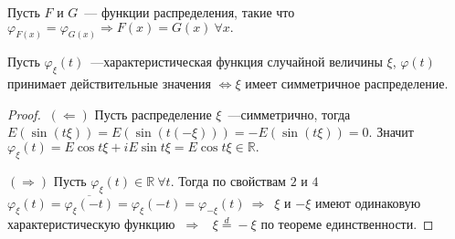 		\begin{theorem}
		Пусть $F$ и $G$~--- функции распределения, такие что $\varphi_{F(x)} = \varphi_{G(x)} \Rightarrow F(x) = G(x)~\forall x.$
	\end{theorem}
	\begin{property}
		Пусть $\varphi_\xi(t)$~---характеристическая функция случайной величины $\xi$, $\varphi(t)$ принимает действительные значения $\Leftrightarrow \xi$ имеет симметричное распределение.
		\begin{proof}
			$~(\Leftarrow)$ Пусть распределение $\xi$~---симметрично, тогда $E(\sin(t\xi)) = E(\sin(t(-\xi))) = -E(\sin(t\xi)) = 0.$ Значит $\varphi_\xi(t) = E\cos t\xi + iE\sin t\xi = E\cos t\xi \in \mathbb{R}.$

			$(\Rightarrow)$ Пусть $\varphi_\xi(t) \in \mathbb{R} ~\forall t.$ Тогда по свойствам $2$ и $4$ $\varphi_\xi(t) = \overline{\varphi_\xi(-t)} = \varphi_\xi(-t) = \varphi_{-\xi}(t) ~\Rightarrow $~$\xi$ и $-\xi$ имеют одинаковую характеристическую функцию $~\Rightarrow$~ $\xi \overset{d}{=} -\xi$ по теореме единственности.
		\end{proof}
	\end{property}

